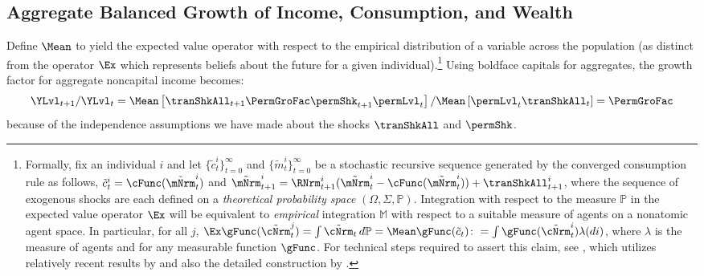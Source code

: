 \documentclass[BufferStockTheory]{subfiles}
\begin{document}



\hypertarget{Growth-Rates-of-Individual-Income-and-Consumption}{}
\subsection{Aggregate Balanced Growth of  Income, Consumption, and Wealth}\label{subsec:cGroEqPermGroFacQ}

Define $\Mean$ to yield the expected value operator with respect to the empirical distribution of a variable across the population (as distinct from the operator $\Ex$ which represents beliefs about the future for a given individual).\footnote{Formally, fix an individual $i$ and let $\{\tilde{c}^{i}_{t}\}_{t=0}^{\infty}$ and $\{\tilde{m}^{i}_{t}\}_{t=0}^{\infty}$ be a stochastic recursive sequence generated by the converged consumption rule as follows, $\tilde{c}^{i}_{t} = \cFunc(\tilde{\mNrm}^{i}_{t})$ and $\tilde{\mNrm}^{i}_{t+1} = \RNrm^{i}_{t+1}(\tilde{\mNrm}^{i}_{t} -\cFunc(\tilde{\mNrm}^{i}_{t})) + \tranShkAll^{i}_{t+1}$, where the sequence of exogenous shocks are each defined on a \textit{theoretical probability space} $(\Omega, \Sigma, \mathbb{P})$. Integration with respect to the measure $\mathbb{P}$ in the expected value operator $\Ex$ will be equivalent to \textit{empirical} integration $\mathbb{M}$ with respect to a suitable measure of agents on a nonatomic agent space. In particular, for all $j$, $\Ex\gFunc(\tilde{\cNrm}_{t}^{j})  = \int \tilde{\cNrm}_{t}\,d\mathbb{P} =  \Mean\gFunc(\tilde{c}_{t})\colon = \int \gFunc(\tilde{\cNrm}_{t}^{i}) \lambda(di)$, where $\lambda$ is the measure of agents and  for any measurable function $\gFunc$. For technical steps required to assert this claim, see \cite{Shanker2017a}, which utilizes  relatively recent results by \cite{Sun2009} and also the detailed construction by \cite{Cao2020}.} Using boldface capitals for aggregates, the growth factor for aggregate noncapital income becomes:
\begin{equation*}
  \YLvl_{t+1}/\YLvl_{t}  = \Mean\left[\tranShkAll_{t+1}\PermGroFac \permShk_{t+1}\permLvl_{t}\right]/\Mean\left[\permLvl_{t}\tranShkAll_{t}\right] = \PermGroFac
\end{equation*}
because of the independence assumptions we have made about the shocks $\tranShkAll$ and $\permShk$.
\end{document}
